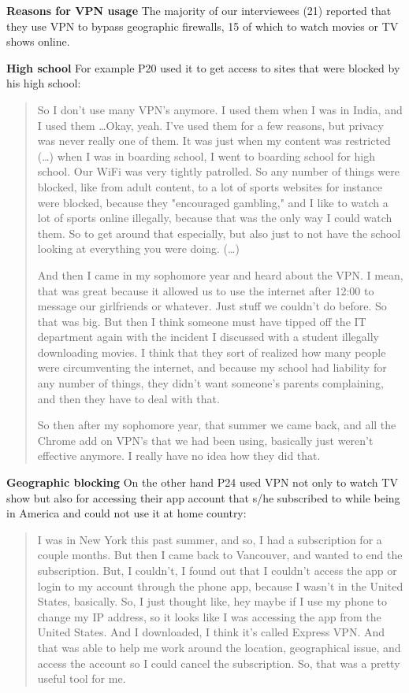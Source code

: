 \textbf{Reasons for VPN usage}
The majority of our interviewees (21) reported that they use VPN to bypass geographic firewalls, 15 of which to watch movies or TV shows online.  

\textbf{High school} For example P20 used it to get access to sites that were blocked by his high school: 
\begin{quote}So I don't use many VPN's anymore. I used them when I was in India, and I used them \dots Okay, yeah. I've used them for a few reasons, but privacy was never really one of them. It was just when my content was restricted (\dots) when I was in boarding school, I went to boarding school for high school. Our WiFi was very tightly patrolled. So any number of things were blocked, like from adult content, to a lot of sports websites for instance were blocked, because they "encouraged gambling," and I like to watch a lot of sports online illegally, because that was the only way I could watch them. So to get around that especially, but also just to not have the school looking at everything you were doing. (\dots) 

And then I came in my sophomore year and heard about the VPN. I mean, that was great because it allowed us to use the internet after 12:00 to message our girlfriends or whatever. Just stuff we couldn't do before. So that was big. But then I think someone must have tipped off the IT department again with the incident I discussed with a student illegally downloading movies. I think that they sort of realized how many people were circumventing the internet, and because my school had liability for any number of things, they didn't want someone's parents complaining, and then they have to deal with that.


So then after my sophomore year, that summer we came back, and all the Chrome add on VPN's that we had been using, basically just weren't effective anymore. I really have no idea how they did that.\end{quote}


\textbf{Geographic blocking} On the other hand P24 used VPN not only to watch TV show but also for accessing their app account that s/he subscribed to while being in America and could not use it at home country:
\begin{quote}I was in New York this past summer, and so, I had a subscription for a couple months. But then I came back to Vancouver, and wanted to end the subscription. But, I couldn't, I found out that I couldn't access the app or login to my account through the phone app, because I wasn't in the United States, basically. So, I just thought like, hey maybe if I use my phone to change my IP address, so it looks like I was accessing the app from the United States. And I downloaded, I think it's called Express VPN. And that was able to help me work around the location, geographical issue, and access the account so I could cancel the subscription. So, that was a pretty useful tool for me.\end{quote}



